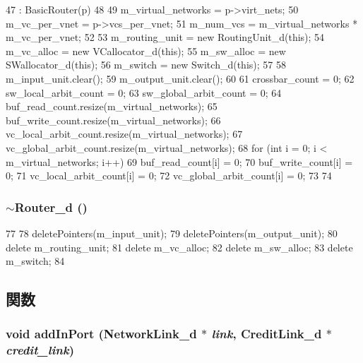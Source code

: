 \begin{DoxyCode}
47     : BasicRouter(p)
48 {
49     m_virtual_networks = p->virt_nets;
50     m_vc_per_vnet = p->vcs_per_vnet;
51     m_num_vcs = m_virtual_networks * m_vc_per_vnet;
52 
53     m_routing_unit = new RoutingUnit_d(this);
54     m_vc_alloc = new VCallocator_d(this);
55     m_sw_alloc = new SWallocator_d(this);
56     m_switch = new Switch_d(this);
57 
58     m_input_unit.clear();
59     m_output_unit.clear();
60 
61     crossbar_count = 0;
62     sw_local_arbit_count = 0;
63     sw_global_arbit_count = 0;
64     buf_read_count.resize(m_virtual_networks);
65     buf_write_count.resize(m_virtual_networks);
66     vc_local_arbit_count.resize(m_virtual_networks);
67     vc_global_arbit_count.resize(m_virtual_networks);
68     for (int i = 0; i < m_virtual_networks; i++) {
69         buf_read_count[i] = 0;
70         buf_write_count[i] = 0;
71         vc_local_arbit_count[i] = 0;
72         vc_global_arbit_count[i] = 0;
73     }
74 }
\end{DoxyCode}
\hypertarget{classRouter__d_a6a41fa2827bd5db9e5201b82733c0acb}{
\subsubsection[{$\sim$Router\_\-d}]{\setlength{\rightskip}{0pt plus 5cm}$\sim${\bf Router\_\-d} ()}}
\label{classRouter__d_a6a41fa2827bd5db9e5201b82733c0acb}



\begin{DoxyCode}
77 {
78     deletePointers(m_input_unit);
79     deletePointers(m_output_unit);
80     delete m_routing_unit;
81     delete m_vc_alloc;
82     delete m_sw_alloc;
83     delete m_switch;
84 }
\end{DoxyCode}


\subsection{関数}
\hypertarget{classRouter__d_a5c19293497c8ba70ccf1fb92c3ae503f}{
\subsubsection[{addInPort}]{\setlength{\rightskip}{0pt plus 5cm}void addInPort ({\bf NetworkLink\_\-d} $\ast$ {\em link}, \/  {\bf CreditLink\_\-d} $\ast$ {\em credit\_\-link})}}
\label{classRouter__d_a5c19293497c8ba70ccf1fb92c3ae503f}



